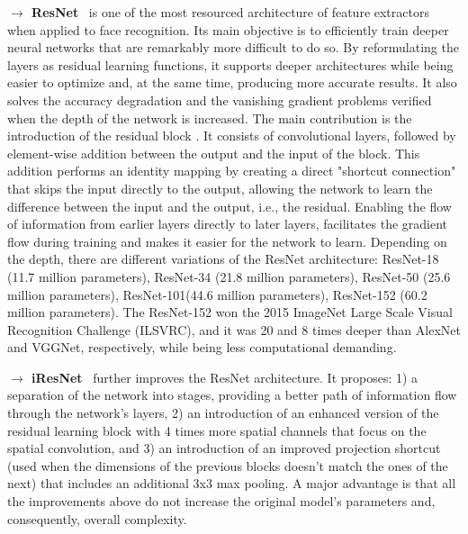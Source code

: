 \documentclass[class=report, crop=false, a4paper, 12pt]{standalone}
\begin{document}
\vspace{0.7\baselineskip}
\noindent\textbf{$\rightarrow$ ResNet}~\autocite{heDeepResidualLearning2016} is one of the most resourced architecture of feature extractors when applied to face recognition. Its main objective is to efficiently train deeper neural networks that are remarkably more difficult to do so. By reformulating the layers as residual learning functions, it supports deeper architectures while being easier to optimize and, at the same time, producing more accurate results. It also solves the accuracy degradation and the vanishing gradient problems verified when the depth of the network is increased. The main contribution is the introduction of the residual block . It consists of convolutional layers, followed by element-wise addition between the output and the input of the block. This addition performs an identity mapping by creating a direct "shortcut connection" that skips the input directly to the output, allowing the network to learn the difference between the input and the output, i.e., the residual. Enabling the flow of information from earlier layers directly to later layers, facilitates the gradient flow during training and makes it easier for the network to learn. Depending on the depth, there are different variations of the ResNet architecture: ResNet-18 (11.7 million parameters), ResNet-34 (21.8 million parameters), ResNet-50 (25.6 million parameters), ResNet-101(44.6 million parameters), ResNet-152 (60.2 million parameters). The ResNet-152 won the 2015 ImageNet Large Scale Visual Recognition Challenge (ILSVRC), and it was 20 and 8 times deeper than AlexNet and VGGNet, respectively, while being less computational demanding.

\newpage
\noindent\textbf{$\rightarrow$ iResNet}~\autocite{dutaImprovedResidualNetworks2021} further improves the ResNet architecture. It proposes: 1) a separation of the network into stages, providing a better path of information flow through the network's layers, 2) an introduction of an enhanced version of the residual learning block with 4 times more spatial channels that focus on the spatial convolution, and 3) an introduction of an improved projection shortcut (used when the dimensions of the previous blocks doesn't match the ones of the next) that includes an additional 3x3 max pooling. A major advantage is that all the improvements above do not increase the original model's parameters and, consequently, overall complexity.
\end{document}
